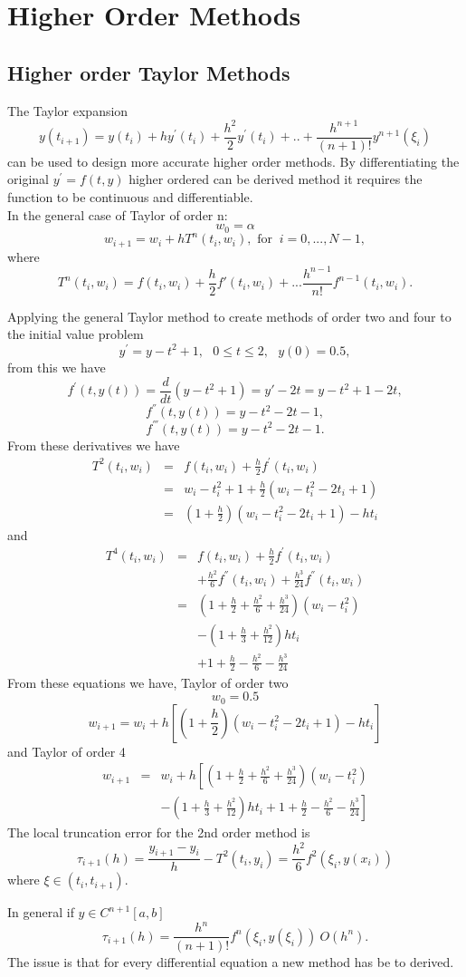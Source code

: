 \chapter{Higher Order Methods}
\section{Higher order Taylor Methods}
The Taylor expansion
\[ y(t_{i+1})=y(t_i)+h y^{'}(t_i)+\frac{h^2}{2}y^{'}(t_i)+..+\frac{h^{n+1}}{(n+1)!}y^{n+1}(\xi_i) \]
can be used to design more accurate higher order methods. 
By differentiating the original  $y^{'}=f(t,y)$  higher ordered can be derived 
method it requires the function to be continuous and differentiable.\\
In the general case of Taylor of order n:
\[ w_0=\alpha \]
\[ w_{i+1} = w_i + hT^n(t_i,w_i), \mbox{   for   } \ i=0,...,N-1, \]
where
\begin{equation} T^{n}(t_i,w_i) = f(t_i,w_i)+\frac{h}{2}f'(t_i,w_i)+...\frac{h^{n-1}}{n!}f^{n-1}(t_i,w_i). \end{equation}
\begin{example}
Applying the general Taylor method to create methods of order two and four to
the initial value problem
\[y^{'}=y-t^2+1, \ \ \ 0\leq t \leq 2, \ \ \ y(0)=0.5, \]
from this we have 
\[ f^{'}(t,y(t)) = \frac{d}{dt}(y-t^2+1) = y'-2t=y-t^2+1-2t, \]
\[ f^{''}(t,y(t)) = y-t^2-2t-1, \]
\[ f^{'''}(t,y(t)) = y-t^2-2t-1. \]
From these derivatives we have
\begin{eqnarray*}
T^{2}(t_i,w_i)&=&f(t_i,w_i)+\frac{h}{2}f^{'}(t_i,w_i)\\
&=&w_i-t_i^2+1+\frac{h}{2}(w_i-t_i^2-2t_i+1)\\
&=&\left(1+\frac{h}{2}\right)(w_i-t_i^2-2t_i+1)-ht_i
\end{eqnarray*}
and
\begin{eqnarray*}
T^{4}(t_i,w_i)&=&f(t_i,w_i)+\frac{h}{2}f^{'}(t_i,w_i)\\
& &+\frac{h^2}{6}f^{''}(t_i,w_i)+\frac{h^3}{24}f^{''}(t_i,w_i)\\
&=&\left(1+\frac{h}{2}+\frac{h^2}{6}+\frac{h^3}{24}\right)(w_i-t_i^2)\\
& &-\left(1+\frac{h}{3}+\frac{h^2}{12}\right)ht_i\\
& & +1+\frac{h}{2}-\frac{h^2}{6}-\frac{h^3}{24}
\end{eqnarray*}
From these equations we have,
Taylor of order two
\[w_0=0.5\]
\[w_{i+1}=w_i+h\left[\left(1+\frac{h}{2}\right)(w_i-t_i^2-2t_i+1)-ht_i
\right] \]
and Taylor of order 4
\begin{eqnarray*}w_{i+1}&=&w_i+h\left[\left(1+\frac{h}{2}+\frac{h^2}{6}+\frac{h^3}{24}\right)(w_i-t_i^2)\right.\\
& &\left.-\left(1+\frac{h}{3}+\frac{h^2}{12}\right)ht_i
 +1+\frac{h}{2}-\frac{h^2}{6}-\frac{h^3}{24}
\right] \end{eqnarray*}
The local truncation error for the 2nd order method is 
\[\tau_{i+1}(h) = \frac{y_{i+1}-y_i}{h} -T^2(t_i,y_i) = \frac{h^2}{6}f^2(\xi_i,y(x_i))\]
where $\xi \in (t_i,t_{i+1})$.
\end{example}
In general if $y \in C^{n+1}[a,b]$
\[\tau_{i+1}(h)=\frac{h^n}{(n+1)!}f^{n}(\xi_i,y(\xi_i))~O(h^n). \]
The issue is that for every differential equation a new method has be to derived.


